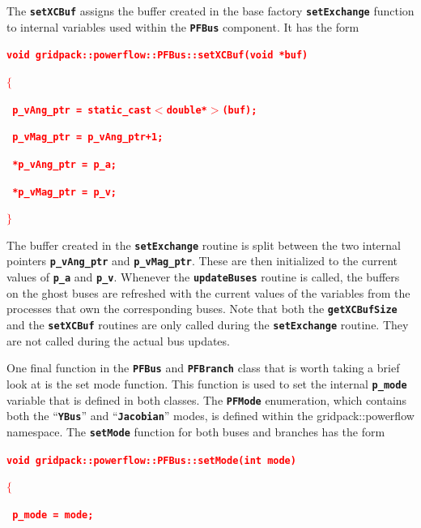 \documentclass[12pt]{report} %
\begin{document}
The \texttt{\textbf{setXCBuf}} assigns the buffer created in the base factory \texttt{\textbf{setExchange}} function to internal variables used within the \texttt{\textbf{PFBus}} component. It has the form

\textcolor{red}{\texttt{\textbf{void gridpack::powerflow::PFBus::setXCBuf(void *buf)}}}

\textcolor{red}{\texttt{\textbf{$\boldsymbol{\mathrm{\{}}$}}}

\textcolor{red}{\texttt{\textbf{  p\_vAng\_ptr = static\_cast$\boldsymbol{\mathrm{<}}$double*$\boldsymbol{\mathrm{>}}$(buf);}}}

\textcolor{red}{\texttt{\textbf{  p\_vMag\_ptr = p\_vAng\_ptr+1;}}}

\textcolor{red}{\texttt{\textbf{  *p\_vAng\_ptr = p\_a;}}}

\textcolor{red}{\texttt{\textbf{  *p\_vMag\_ptr = p\_v;}}}

\textcolor{red}{\texttt{\textbf{$\boldsymbol{\mathrm{\}}}$}}}

The buffer created in the \texttt{\textbf{setExchange}} routine is split between the two internal pointers \texttt{\textbf{p\_vAng\_ptr}} and \texttt{\textbf{p\_vMag\_ptr}}. These are then initialized to the current values of \texttt{\textbf{p\_a}} and \texttt{\textbf{p\_v}}. Whenever the \texttt{\textbf{updateBuses}} routine is called, the buffers on the ghost buses are refreshed with the current values of the variables from the processes that own the corresponding buses. Note that both the \texttt{\textbf{getXCBufSize}} and the \texttt{\textbf{setXCBuf}} routines are only called during the \texttt{\textbf{setExchange}} routine. They are not called during the actual bus updates.

One final function in the \texttt{\textbf{PFBus}} and \texttt{\textbf{PFBranch}} class that is worth taking a brief look at is the set mode function. This function is used to set the internal \texttt{\textbf{p\_mode}} variable that is defined in both classes. The \texttt{\textbf{PFMode}} enumeration, which contains both the ``\texttt{\textbf{YBus}}'' and ``\texttt{\textbf{Jacobian}}'' modes, is defined within the gridpack::powerflow namespace. The \texttt{\textbf{setMode}} function for both buses and branches has the form

\textcolor{red}{\texttt{\textbf{void gridpack::powerflow::PFBus::setMode(int mode)}}}

\textcolor{red}{\texttt{\textbf{$\boldsymbol{\mathrm{\{}}$}}}

\textcolor{red}{\texttt{\textbf{  p\_mode = mode;}}}
\end{document}
